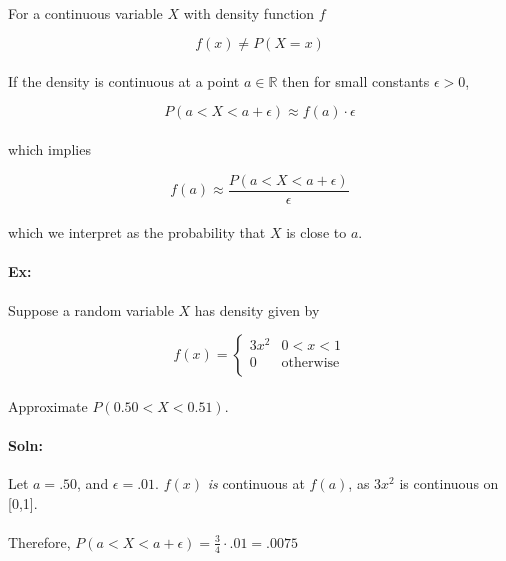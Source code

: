 \documentclass{article}
\begin{document}
    \paragraph{}For a continuous variable $X$ with density function $f$
   
    \[
    f(x)\ne P(X = x)
    \]
    \paragraph{}If the density is continuous at a point $a \in \mathbb{R}$ then for small constants
    $\epsilon > 0$,
    
    \[
        P(a < X < a+\epsilon) \approx f(a)\cdot \epsilon
    \]
    \paragraph{}which implies

    
    \[
        f(a) \approx \frac{P(a < X < a + \epsilon)}{\epsilon}
    \]
    \paragraph{}which we interpret as the probability that $X$ is close to $a$.

    \paragraph{Ex:} Suppose a random variable $X$ has density given by 
    
    \[ f(x) = \begin{cases}
        3x^2 & 0<x<1 \\
        0 & \text{otherwise}\\
        \end{cases}
    \]
    \paragraph{}Approximate $P(0.50 < X < 0.51)$.

    \paragraph{Soln:}Let $a = .50$, and $\epsilon = .01$. $f(x)$ \emph{is} continuous at $f(a)$, as $3x^2$ is
    continuous on [0,1]. 

    \paragraph{}Therefore, $P(a < X < a+\epsilon) = \frac{3}{4} \cdot .01 = .0075$
\end{document}
